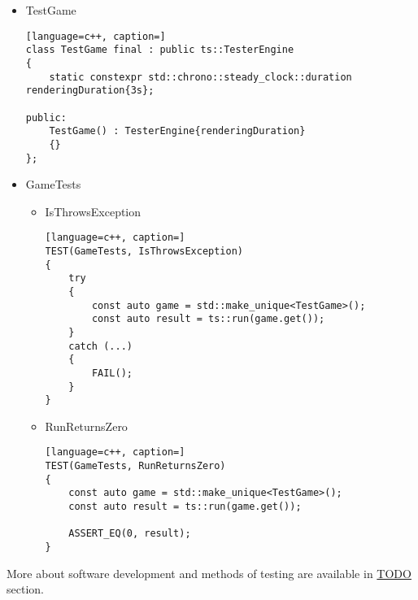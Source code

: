 \begin{itemize}
\begin{itemize}
\begin{lstlisting}[language=c++, caption=]
    const ts::math::Vec3 axis{0.f, 1.f, 0.f};
    const auto result = ts::math::rotate(matrix, axis, ts::math::radians(180.f));

    const ts::math::Mat4 expected
    {
        -1.f, +0.f, +0.f, +0.f,
        +0.f, +1.f, +0.f, +0.f,
        +0.f, +0.f, -1.f, +0.f,
        +0.f, +0.f, +0.f, +1.f,
    };
    ASSERT_TRUE(expected[0].x == result[0].x and expected[1].y == result[1].y and expected[2].z == result[2].z);
}
            \end{lstlisting}
        \end{itemize}
    \item TestGame
        \begin{lstlisting}[language=c++, caption=]
class TestGame final : public ts::TesterEngine
{
    static constexpr std::chrono::steady_clock::duration renderingDuration{3s};

public:
    TestGame() : TesterEngine{renderingDuration}
    {}
};
        \end{lstlisting}
    \item GameTests
        \begin{itemize}
            \item IsThrowsException
            \begin{lstlisting}[language=c++, caption=]
TEST(GameTests, IsThrowsException)
{
    try
    {
        const auto game = std::make_unique<TestGame>();
        const auto result = ts::run(game.get());
    }
    catch (...)
    {
        FAIL();
    }
}
            \end{lstlisting}
            \item RunReturnsZero
            \begin{lstlisting}[language=c++, caption=]
TEST(GameTests, RunReturnsZero)
{
    const auto game = std::make_unique<TestGame>();
    const auto result = ts::run(game.get());

    ASSERT_EQ(0, result);
}
            \end{lstlisting}
        \end{itemize}
\end{itemize}

More about software development and methods of testing are available in \hyperref[sec:testing]{TODO} section.